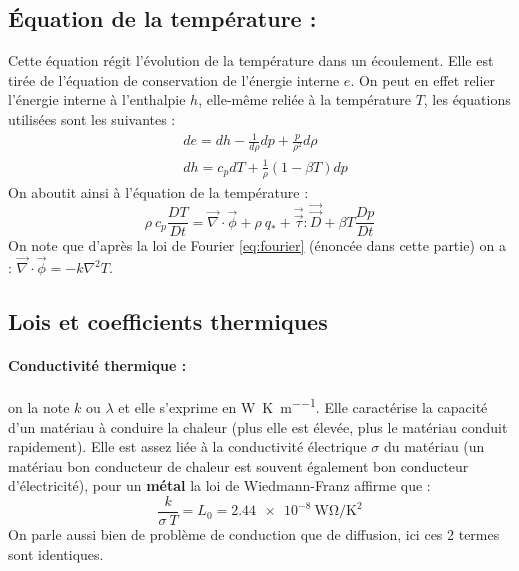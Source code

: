
\subsection{Équation de la température :}

Cette équation régit l'évolution de la température dans un écoulement. Elle est tirée de l'équation de conservation de l'énergie interne $e$. On peut en effet relier l'énergie interne à l'enthalpie $h$, elle-même reliée à la température $T$, les équations utilisées sont les suivantes :
%
\begin{align}
    & de = dh - \frac{1}{d\rho} dp + \frac{p}{\rho^2} d\rho \\
    & dh = c_p dT + \frac{1}{\rho} \left( 1 - \beta T \right) dp
\end{align}
%
On aboutit ainsi à l'équation de la température :
%
\begin{equation}
    \rho~c_p \frac{DT}{Dt}
    = \vec{\nabla} \cdot \vec{\phi} %
    + \rho~q_*
    + \vec{\vec{\tau}} : \vec{\vec{D}}
    + \beta T\frac{Dp}{Dt}
    \label{eq:temperature}
\end{equation}
%
On note que d'après la loi de Fourier \eqref{eq:fourier} (énoncée dans cette partie) on a : $\vec{\nabla} \cdot \vec{\phi} = - k \nabla^2 T$.


\subsection{Lois et coefficients thermiques}

\paragraph{Conductivité thermique :}on la note $k$ ou $\lambda$ et elle s'exprime en \si{\watt\per\kelvin\per\meter}. Elle caractérise la capacité d'un matériau à conduire la chaleur (plus elle est élevée, plus le matériau conduit rapidement). Elle est assez liée à la conductivité électrique $\sigma$ du matériau (un matériau bon conducteur de chaleur est souvent également bon conducteur d'électricité), pour un \textbf{métal} la loi de Wiedmann-Franz affirme que :
%
\begin{equation}
    \frac{k}{\sigma~T} = L_0 = \SI{2.44e-8}{\watt\ohm\per\square\kelvin}
\end{equation}
%
On parle aussi bien de problème de conduction que de diffusion, ici ces 2 termes sont identiques.


